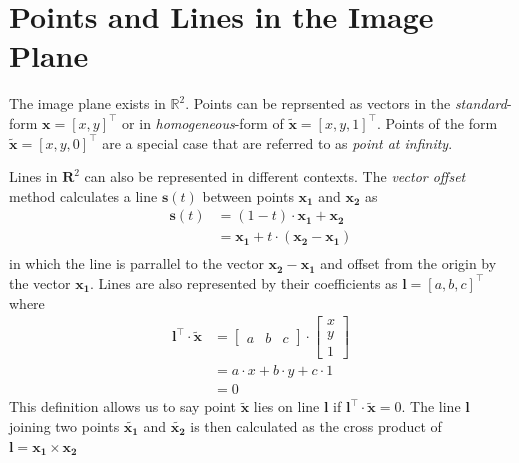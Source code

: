\documentclass{report}
\begin{document}
\section{Points and Lines in the Image Plane}
\par The image plane exists in $\mathbb{R}^2$. Points can be reprsented as vectors in the \textit{standard}-form $\mathbf{x}=[x,y]^\intercal$ or in \textit{homogeneous}-form of $\mathbf{\tilde{x}}=[x,y,1]^\intercal$. Points of the form $\mathbf{\tilde{x}}=[x,y,0]^\intercal$ are a special case that are referred to as \textit{point at infinity}.
\par
Lines in $\mathbf{R}^2$ can also be represented in different contexts. The \textit{vector offset} method calculates a line $\mathbf{s}(t)$ between points $\mathbf{x_1}$ and $\mathbf{x_2}$ as
\begin{equation*}
\begin{split}
\mathbf{s}(t)&=(1-t)\cdot\mathbf{x_1}+\mathbf{x_2}\\
&=\mathbf{x_1}+t\cdot(\mathbf{x_2}-\mathbf{x_1})\\
\end{split}
\end{equation*}
in which the line is parrallel to the vector $\mathbf{x_2}-\mathbf{x_1}$ and offset from the  origin by the vector $\mathbf{x_1}$. Lines are also represented by their coefficients as $\mathbf{l}=[a,b,c]^\intercal$ where
\begin{equation*}
\begin{split}
\mathbf{l}^\intercal\cdot\mathbf{\tilde{x}}&=\left[\begin{array}{ccc}a & b & c\end{array}\right]\cdot\left[\begin{array}{c}x\\y\\1\end{array}\right]\\
&=a\cdot{x}+b\cdot{y}+c\cdot{1}\\
&=0
\end{split}
\end{equation*}
This definition allows us to say point $\mathbf{\tilde{x}}$ lies on line $\mathbf{l}$ if $\mathbf{l}^\intercal\cdot\mathbf{\tilde{x}}=0$. The line $\mathbf{l}$ joining two points $\mathbf{\tilde{x_1}}$ and $\mathbf{\tilde{x_2}}$ is then calculated as the cross product of $\mathbf{l}=\mathbf{x_1}\times\mathbf{x_2}$
\end{document}
